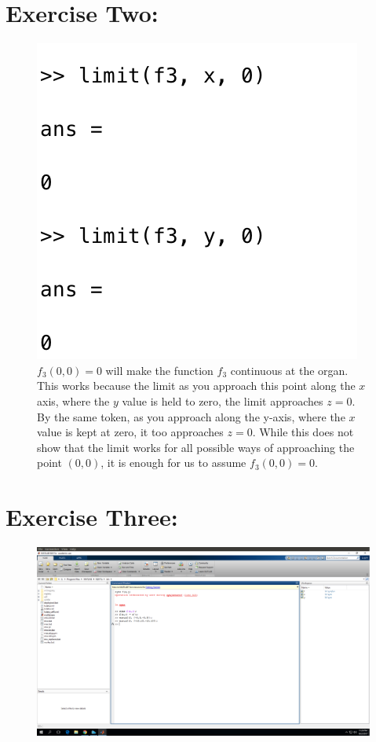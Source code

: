 \documentclass[11pt]{article}
\begin{document}
\section*{Exercise Two:}
\begin{figure}[H]
	\centering
	\includegraphics[width=\textwidth]{PartTwo}
	\caption{$f_3 (0,0)= 0$ will make the function $f_3$ continuous at the organ. This works because the limit as you approach this point along the $x$ axis, where the $y$ value is held to zero, the limit approaches $z = 0$.  By the same token, as you approach along the y-axis, where the $x$ value is kept at zero, it too approaches $z = 0$. While this does not show that the limit works for all possible ways of approaching the point $(0, 0)$, it is enough for us to assume $f_3 (0, 0) = 0$.}
\end{figure}

\section*{Exercise Three:}
\begin{figure}[H]
	\centering
	\includegraphics[width=\textwidth]{PartThree_1.png}
\end{figure}
\end{document}
